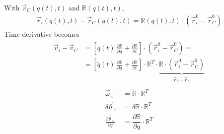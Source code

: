 \documentclass[letterpaper,10pt,english]{jupyterBook}
\begin{document}
\sphinxAtStartPar
With \(\vec{r}_C\left(q(t),t \right)\) and \(\mathbb{R}\left(q(t), t \right)\),
\begin{equation*}
\begin{split}\vec{r}_i(q(t), t) - \vec{r}_C(q(t), t) = \mathbb{R}(q(t), t) \cdot \left( \vec{r}_i^0 - \vec{r}_C^0 \right)\end{split}
\end{equation*}
\sphinxAtStartPar
Time derivative becomes
\begin{equation*}
\begin{split}\begin{aligned}
\vec{v}_i - \vec{v}_C
 & = \left[ \dot{q}(t) \, \frac{\partial \mathbb{R}}{\partial q} + \frac{\partial \mathbb{R}}{\partial t} \right] \cdot \left( \vec{r}_i^0 - \vec{r}_C^0 \right) = \\
 & =  \left[ \dot{q}(t) \, \frac{\partial \mathbb{R}}{\partial q} + \frac{\partial \mathbb{R}}{\partial t} \right] \cdot \mathbb{R}^T \cdot \underbrace{\mathbb{R} \cdot \left( \vec{r}_i^0 - \vec{r}_C^0 \right)}_{\vec{r}_i - \vec{r}_C}
\end{aligned}\end{split}
\end{equation*}\begin{equation*}
\begin{split}\begin{aligned}
  \vec{\omega}_\times & = \dot{\mathbb{R}} \cdot \mathbb{R}^T \\
  \delta \vec{\theta}_{\times} & = \delta \mathbb{R} \cdot \mathbb{R}^T \\
  \frac{\partial \vec{\theta}_{\times}}{\partial q} & = \dfrac{\partial \mathbb{R}}{\partial q} \cdot \mathbb{R}^T
\end{aligned}\end{split}
\end{equation*}

 \label{exercise:ch/exercises-dynamics-exercise-1}
\end{document}
